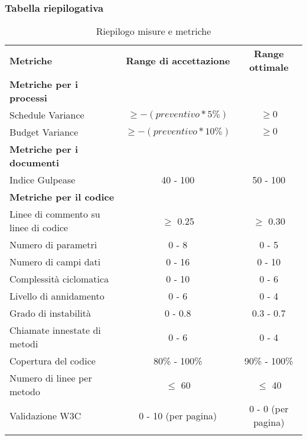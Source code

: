 \documentclass[../PianoDiQualifica.tex]{subfiles}
\begin{document}
			\subsubsection{Tabella riepilogativa}
				\begin{table}[H]
					\begin{tabular}{!{\VRule[1.4pt]}l!{\VRule}c!{\VRule}c!{\VRule[1.4pt]}}
						\textbf{Metriche} & \textbf{Range di accettazione} & \textbf{Range ottimale} \\
						\textbf{Metriche per i processi} & & \\ \hline
						Schedule Variance & $\geq -(preventivo*5\%)$ & $\geq 0$ \\ \hline
						Budget Variance & $\geq -(preventivo*10\%)$ & $\geq 0$ \\ \hline
						\textbf{Metriche per i documenti} & & \\ \hline
						Indice Gulpease & 40 - 100 & 50 - 100 \\
						\textbf{Metriche per il codice} &  &  \\ \hline
						Linee di commento su linee di codice & $\geq$ 0.25 & $\geq$ 0.30 \\ \hline
						Numero di parametri & 0 - 8 & 0 - 5  \\ \hline
						Numero di campi dati & 0 - 16 & 0 - 10 \\ \hline
						Complessità ciclomatica & 0 - 10 & 0 - 6  \\ \hline
						Livello di annidamento & 0 - 6 & 0 - 4 \\ \hline
						Grado di instabilità & 0 - 0.8 & 0.3 - 0.7 \\ \hline
						Chiamate innestate di metodi & 0 - 6 & 0 - 4 \\ \hline
						Copertura del codice & 80\% - 100\% & 90\% - 100\% \\ \hline
						Numero di linee per metodo & $\leq$ 60 & $\leq$ 40 \\ \hline
						Validazione W3C & 0 - 10 (per pagina) & 0 - 0 (per pagina) \\
					\end{tabular}
					\caption{Riepilogo misure e metriche}
				\end{table}
\end{document}

